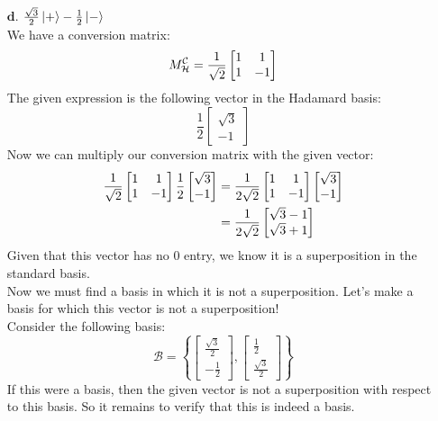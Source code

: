\documentclass[11pt]{article}
\def\srtt{\ensuremath\frac{1}{\sqrt{2}}}
\begin{document}
\begin{enumerate}
\newpage
\item[$\textbf{d.}$] $\frac{\sqrt{3}}{2}\ket{+} - \frac{1}{2}\ket{-}$ \\
	We have a conversion matrix: 
		$$M^{\mathcal{C}}_{\mathcal{H}} = \srtt\begin{bmatrix}1&1 \\ 1&-1\end{bmatrix}$$
	The given expression is the following vector in the Hadamard basis: 
		$$\frac{1}{2}\begin{bmatrix}\sqrt{3}\\ - 1\end{bmatrix}$$
	Now we can multiply our conversion matrix with the given vector:
	\begin{align*}
	\srtt\begin{bmatrix}1&1 \\ 1&-1\end{bmatrix}\frac{1}{2}\begin{bmatrix}\sqrt{3}\\ - 1\end{bmatrix} 
		&= \frac{1}{2\sqrt{2}} \begin{bmatrix}1&1 \\ 1&-1\end{bmatrix} \begin{bmatrix}\sqrt{3}\\ - 1\end{bmatrix} \\
			&= \frac{1}{2\sqrt{2}} \begin{bmatrix}\sqrt{3} - 1 \\ \sqrt{3} + 1\end{bmatrix}
	\end{align*}
	Given that this vector has no 0 entry, we know it is a superposition in the standard basis. \\
	Now we must find a basis in which it is not a superposition.
	Let's make a basis for which this vector is not a superposition!  \\
	Consider the following basis:
		$$\mathcal{B} = \left\{\begin{bmatrix}\frac{\sqrt{3}}{2} \\ -\frac{1}{2}\end{bmatrix}, \begin{bmatrix}\frac{1}{2} \\ \frac{\sqrt{3}}{2}\end{bmatrix} \right\}$$
	If this were a basis, then the given vector is not a superposition with respect to this basis. So it remains to verify that this is indeed a basis.

\end{enumerate}
\end{document}
